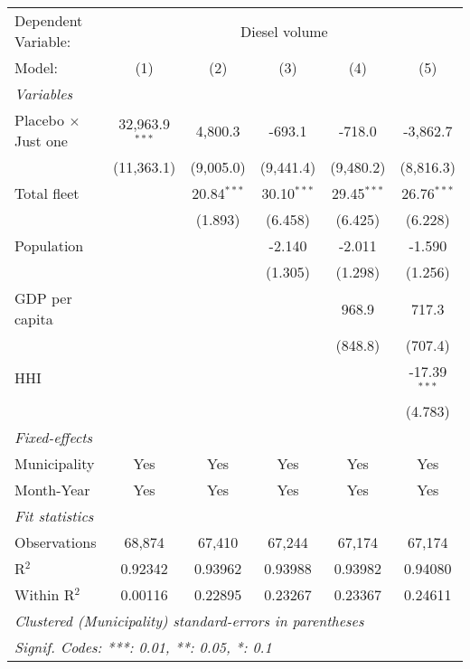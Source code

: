 \documentclass[
]{article}
\begin{document}
\begin{tabular}{lccccc}
\tabularnewline\midrule\midrule
Dependent Variable:&\multicolumn{5}{c}{Diesel volume}\\
Model:&(1) & (2) & (3) & (4) & (5)\\
\midrule \emph{Variables}&   &   &   &   &  \\
Placebo $\times $ Just one & 32,963.9$^{***}$ & 4,800.3 & -693.1 & -718.0 & -3,862.7\\
  &(11,363.1) & (9,005.0) & (9,441.4) & (9,480.2) & (8,816.3)\\
Total fleet &    & 20.84$^{***}$ & 30.10$^{***}$ & 29.45$^{***}$ & 26.76$^{***}$\\
  &   & (1.893) & (6.458) & (6.425) & (6.228)\\
Population &    &    & -2.140 & -2.011 & -1.590\\
  &   &    & (1.305) & (1.298) & (1.256)\\
GDP per capita &    &    &    & 968.9 & 717.3\\
  &   &    &    & (848.8) & (707.4)\\
HHI &    &    &    &    & -17.39$^{***}$\\
  &   &    &    &    & (4.783)\\
\midrule \emph{Fixed-effects}&   &   &   &   &  \\
Municipality & Yes & Yes & Yes & Yes & Yes\\
Month-Year & Yes & Yes & Yes & Yes & Yes\\
\midrule \emph{Fit statistics}&  & & & & \\
Observations & 68,874&67,410&67,244&67,174&67,174\\
R$^2$ & 0.92342&0.93962&0.93988&0.93982&0.94080\\
Within R$^2$ & 0.00116&0.22895&0.23267&0.23367&0.24611\\
\midrule\midrule\multicolumn{6}{l}{\emph{Clustered (Municipality) standard-errors in parentheses}}\\
\multicolumn{6}{l}{\emph{Signif. Codes: ***: 0.01, **: 0.05, *: 0.1}}\\
\end{tabular}
\end{document}
